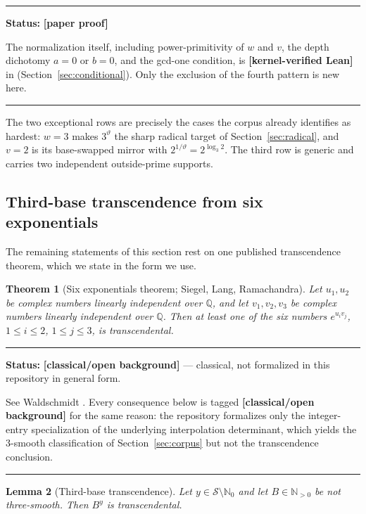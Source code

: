 \documentclass[11pt,oneside]{article}
\newtheorem{theorem}{Theorem}[section]
\newtheorem{lemma}[theorem]{Lemma}
\theoremstyle{definition}
\theoremstyle{remark}
\newcommand{\N}{\mathbb N}
\newcommand{\Nzero}{\mathbb N_0}
\newcommand{\Q}{\mathbb Q}
\newcommand{\thetaq}{\vartheta}
\newcommand{\Sol}{\mathcal S}
\newcommand{\lean}[1]{\texttt{\detokenize{#1}}}
\newcommand{\statuslean}{\textcolor{leanblue}{\textbf{[kernel-verified Lean]}}}
\newcommand{\statusnew}{\textcolor{newgreen}{\textbf{[paper proof]}}}
\newcommand{\statusknown}{\textcolor{classicalgray}{\textbf{[classical/open background]}}}
\newenvironment{statusbox}[1]
{\begin{center}\begin{minipage}{0.94\textwidth}\raggedright\hbadness=10000\hrule
\vspace{0.45em}\textbf{Status:} #1\par\vspace{0.35em}}
{\vspace{0.35em}\hrule\end{minipage}\end{center}}
\begin{document}
\begin{statusbox}{\statusnew{}}
The normalization itself, including power-primitivity of $w$ and $v$, the depth dichotomy
$a=0$ or $b=0$, and the gcd-one condition, is \statuslean{} in \lean{OutputNormalization}
(Section~\ref{sec:conditional}).  Only the exclusion of the fourth pattern is new here.
\end{statusbox}

The two exceptional rows are precisely the cases the corpus already identifies as hardest:
$w=3$ makes $3^{\thetaq}$ the sharp radical target of Section~\ref{sec:radical}, and $v=2$ is
its base-swapped mirror with $2^{1/\thetaq}=2^{\log_3 2}$.  The third row is generic and
carries two independent outside-prime supports.

\subsection{Third-base transcendence from six exponentials}

The remaining statements of this section rest on one published transcendence theorem, which
we state in the form we use.

\begin{theorem}[Six exponentials theorem; Siegel, Lang, Ramachandra]
\label{sm:six-exp}
Let $u_1,u_2$ be complex numbers linearly independent over $\Q$, and let $v_1,v_2,v_3$ be
complex numbers linearly independent over $\Q$.  Then at least one of the six numbers
$e^{u_iv_j}$, $1\le i\le2$, $1\le j\le3$, is transcendental.
\end{theorem}

\begin{statusbox}{\statusknown{} --- classical, not formalized in this repository in general
form.}
See Waldschmidt \cite{Waldschmidt2000,Waldschmidt2005}.  Every consequence below is tagged
\statusknown{} for the same reason: the repository formalizes only the integer-entry
specialization of the underlying interpolation determinant, which yields the $3$-smooth
classification of Section~\ref{sec:corpus} but not the transcendence conclusion.
\end{statusbox}

\begin{lemma}[Third-base transcendence]
\label{sm:third-base-trans}
Let $y\in\Sol\setminus\Nzero$ and let $B\in\N_{>0}$ be not three-smooth.  Then $B^y$ is
transcendental.
\end{lemma}
\end{document}
